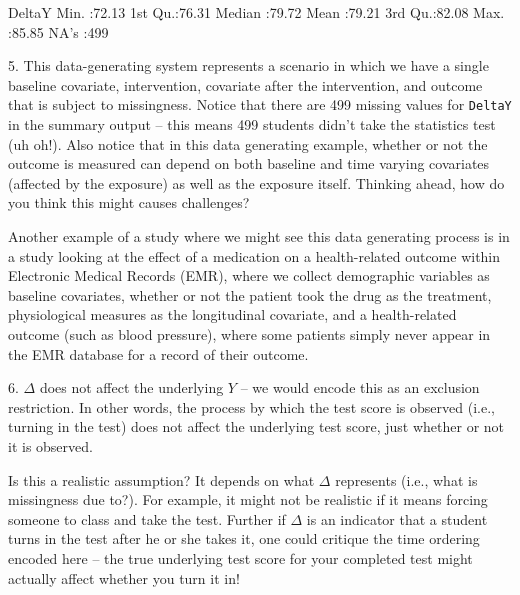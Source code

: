 \documentclass[answers]{exam}
\newenvironment{myfigure}{\captionsetup{type=mytype}}{}
\begin{document}
\begin{solution}
\begin{Schunk}
\begin{Soutput}
     DeltaY     
 Min.   :72.13  
 1st Qu.:76.31  
 Median :79.72  
 Mean   :79.21  
 3rd Qu.:82.08  
 Max.   :85.85  
 NA's   :499    
\end{Soutput}
\end{Schunk}

5. This data-generating system represents a scenario in which we have a single baseline covariate, intervention, covariate after the intervention, and outcome that is subject to missingness. Notice that there are 499 missing values for \texttt{DeltaY} in the summary output -- this means 499 students didn't take the statistics test (uh oh!). Also notice that in this data generating example, whether or not the outcome is measured can depend on both baseline and time varying covariates (affected by the exposure) as well as the exposure itself. Thinking ahead, how do you think this might causes challenges? 

Another example of a study where we might see this data generating process is in a study looking at the effect of a medication on a health-related outcome within Electronic Medical Records (EMR), where we collect demographic variables as baseline covariates, whether or not the patient took the drug as the treatment, physiological measures as the longitudinal covariate, and a health-related outcome (such as blood pressure), where some patients simply never appear in the EMR database for a record of their outcome.


6. $\Delta$ does not affect the underlying $Y$ -- we would encode this as an exclusion restriction. In other words, the process by which the test score is observed (i.e., turning in the test) does not affect the underlying test score, just whether or not it is observed.

Is this a realistic assumption? It depends on what $\Delta$ represents (i.e., what is missingness due to?). For example, it might not be realistic if it means forcing someone to class and take the test. Further if $\Delta$ is an indicator that a student turns in the test after he or she takes it, one could critique the time ordering encoded here -- the true underlying test score for your completed test might actually affect whether you turn it in!
\end{solution}
\end{document}
